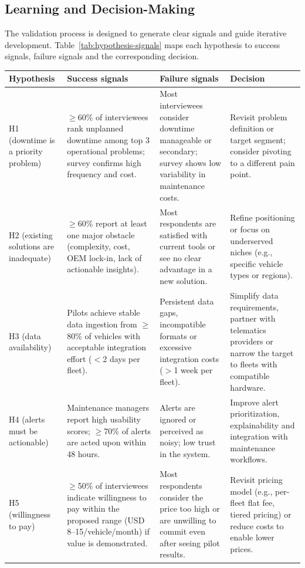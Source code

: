 \documentclass[11pt,a4paper]{article}
\begin{document}
\subsection{Learning and Decision-Making}
\noindent The validation process is designed to generate clear signals and guide iterative development. Table~\ref{tab:hypothesis-signals} maps each hypothesis to success signals, failure signals and the corresponding decision.

\begin{table}[H]
\centering
\small
\begin{tabularx}{\linewidth}{X X X X}
\toprule
\textbf{Hypothesis} & \textbf{Success signals} & \textbf{Failure signals} & \textbf{Decision} \\
\midrule

H1 (downtime is a priority problem) &
$\geq$60\% of interviewees rank unplanned downtime among top 3 operational problems; survey confirms high frequency and cost. &
Most interviewees consider downtime manageable or secondary; survey shows low variability in maintenance costs. &
Revisit problem definition or target segment; consider pivoting to a different pain point. \\

H2 (existing solutions are inadequate) &
$\geq$60\% report at least one major obstacle (complexity, cost, OEM lock-in, lack of actionable insights). &
Most respondents are satisfied with current tools or see no clear advantage in a new solution. &
Refine positioning or focus on underserved niches (e.g., specific vehicle types or regions). \\

H3 (data availability) &
Pilots achieve stable data ingestion from $\geq$80\% of vehicles with acceptable integration effort ($<$2 days per fleet). &
Persistent data gaps, incompatible formats or excessive integration costs ($>$1 week per fleet). &
Simplify data requirements, partner with telematics providers or narrow the target to fleets with compatible hardware. \\

H4 (alerts must be actionable) &
Maintenance managers report high usability scores; $\geq$70\% of alerts are acted upon within 48 hours. &
Alerts are ignored or perceived as noisy; low trust in the system. &
Improve alert prioritization, explainability and integration with maintenance workflows. \\

H5 (willingness to pay) &
$\geq$50\% of interviewees indicate willingness to pay within the proposed range (USD 8--15/vehicle/month) if value is demonstrated. &
Most respondents consider the price too high or are unwilling to commit even after seeing pilot results. &
Revisit pricing model (e.g., per-fleet flat fee, tiered pricing) or reduce costs to enable lower prices. \\


\end{tabularx}
\end{table}
\end{document}
